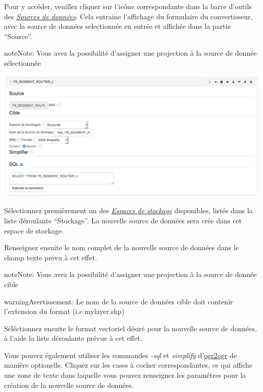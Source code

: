 \documentclass[letterpaper,10pt,french]{sphinxmanual}
\begin{document}
Pour y accéder, veuillez cliquer sur l'icône correspondante dans la
barre d'outils des {\hyperref[data/datasources::doc]{\emph{\emph{Sources de données}}}}. Cela entraine l'affichage du
formulaire du convertisseur, avec la source de données selectionnée en
entrée et affichée dans la partie ``Source''.

\begin{notice}{note}{Note:}
Vous avez la possibilité d'assigner une projection à la source de donnée sélectionnée
\end{notice}

\includegraphics[width=1.000\linewidth]{vector-converter-window.png}

Sélectionnez premièrement un des {\hyperref[data/datastores::doc]{\emph{\emph{Espaces de stockage}}}} disponibles, listés dans la liste déroulante ``Stockage''. La nouvelle source de données sera crée dans cet espace de stockage.

Renseignez ensuite le nom complet de la nouvelle source de données dans le champ texte prévu à cet effet.

\begin{notice}{note}{Note:}
Vous avez la possibilité d'assigner une projection à la source de donnée cible
\end{notice}

\begin{notice}{warning}{Avertissement:}
Le nom de la source de données cible doit contenir l'extension du format (i.e mylayer.shp)
\end{notice}

Séléctionnez ensuite le format vectoriel désiré pour la nouvelle source de données, à l'aide la liste déroulante prévue à cet effet.

Vous pouvez également utiliser les commandes \emph{-sql} et \emph{simplify}
d'\href{http://www.gdal.org/ogr2ogr.html}{ogr2ogr} de manière
optionelle. Cliquez sur les cases à cocher correspondantes, ce qui
affiche une zone de texte dans laquelle vous pouvez renseigner les
paramétres pour la création de la nouvelle source de données.
\end{document}
